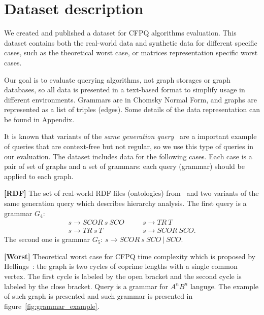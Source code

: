 \section{Dataset description}

We created and published a dataset for CFPQ algorithms evaluation.
This dataset contains both the real-world data and synthetic data for different specific cases, such as the theoretical worst case, or matrices representation specific worst cases.

Our goal is to evaluate querying algorithms, not graph storages or graph databases, so all data is presented in a text-based format to simplify usage in different environments.
Grammars are in Chomsky Normal Form, and graphs are represented as a list of triples (edges).
Some details of the data representation can be found in Appendix.

It is known that variants of the \textit{same generation query}~\cite{FndDB} are a important example of queries that are context-free but not regular, so we use this type of queries in our evaluation.
The dataset includes data for the following cases.
Each case is a pair of set of graphs and a set of grammars: each query (grammar) should be applied to each graph.

\textbf{[RDF]} The set of real-world RDF files (ontologies) from~\cite{RDF} and two variants of the same generation query which describes hierarchy analysis.
The first query is a grammar $G_4$:
\[
 \begin{array}{lcl}
   s  \rightarrow \textit{SCOR} \ s \ \textit{SCO}   & \quad & s  \rightarrow \textit{TR} \ \textit{T}     \\
   s  \rightarrow  \textit{TR}  \ s \ \textit{T}     & \quad & s  \rightarrow \textit{SCOR} \ \textit{SCO} .

 \end{array}
 \]
The second one is grammar $G_5$: $s \rightarrow \textit{SCOR} \ s \ \textit{SCO} \ | \  \textit{SCO}$.

\textbf{[Worst]} Theoretical worst case for CFPQ time complexity which is proposed by Hellings~\cite{hellingsPathQuerying}: the graph is two cycles of coprime lengths with a single common vertex.
The first cycle is labeled by the open bracket and the second cycle is labeled by the close bracket.
Query is a grammar for $A^nB^n$ languge.
The example of such graph is presented and such grammar is presented in figure~\ref{fig:grammar_example}.

